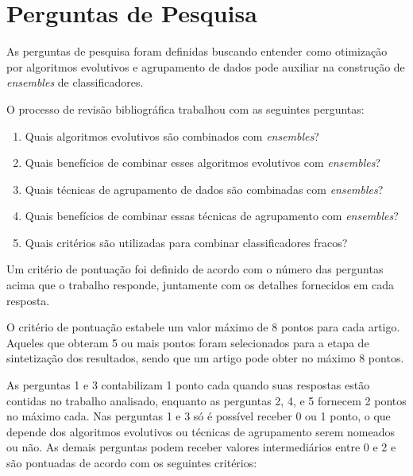 \documentclass[12pt]{report}
\begin{document}
\section{Perguntas de Pesquisa} \label{sec:perguntas_de_pesquisa}

As perguntas de pesquisa foram definidas buscando entender como otimização por algoritmos evolutivos e agrupamento de dados pode auxiliar na construção de \textit{ensembles} de classificadores.

O processo de revisão bibliográfica trabalhou com as seguintes perguntas:

\begin{enumerate}
    \item Quais algoritmos evolutivos são combinados com \textit{ensembles}?
    \item Quais benefícios de combinar esses algoritmos evolutivos com \textit{ensembles}?
    \item Quais técnicas de agrupamento de dados são combinadas com \textit{ensembles}?
    \item Quais benefícios de combinar essas técnicas de agrupamento com \textit{ensembles}?
    \item Quais critérios são utilizadas para combinar classificadores fracos?
\end{enumerate}

Um critério de pontuação foi definido de acordo com o número das perguntas acima que o trabalho responde, juntamente com os detalhes fornecidos em cada resposta.

O critério de pontuação estabele um valor máximo de 8 pontos para cada artigo. Aqueles que obteram 5 ou mais pontos foram selecionados para a etapa de sintetização dos resultados, sendo que um artigo pode obter no máximo 8 pontos.

As perguntas 1 e 3 contabilizam 1 ponto cada quando suas respostas estão contidas no trabalho analisado, enquanto as perguntas 2, 4, e 5 fornecem 2 pontos no máximo cada. Nas perguntas 1 e 3 só é possível receber 0 ou 1 ponto, o que depende dos algoritmos evolutivos ou técnicas de agrupamento serem nomeados ou não. As demais perguntas podem receber valores intermediários entre 0 e 2 e são pontuadas de acordo com os seguintes critérios:
\end{document}
